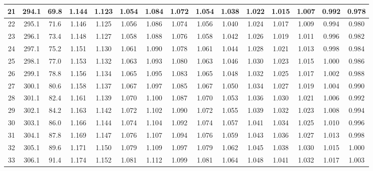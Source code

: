 \documentclass[12pt,a4paper,twoside]{article}
\begin{document}
\begin{center}
\begin{longtable}{ c c c | c c c c c c c c c c c c}
 21 & 294.1 & 69.8 & 1.144 & 1.123 & 1.054 & 1.084 & 1.072 & 1.054 & 1.038 & 1.022 & 1.015 & 1.007 & 0.992 & 0.978 \\ \hline   
 
 22 & 295.1 & 71.6 & 1.146 & 1.125 & 1.056 & 1.086 & 1.074 & 1.056 & 1.040 & 1.024 & 1.017 & 1.009 & 0.994 & 0.980 \\ \hline   
 
 23 & 296.1 & 73.4 & 1.148 & 1.127 & 1.058 & 1.088 & 1.076 & 1.058 & 1.042 & 1.026 & 1.019 & 1.011 & 0.996 & 0.982 \\ \hline   
 
 24 & 297.1 & 75.2 & 1.151 & 1.130 & 1.061 & 1.090 & 1.078 & 1.061 & 1.044 & 1.028 & 1.021 & 1.013 & 0.998 & 0.984 \\ \hline   
 
 25 & 298.1 & 77.0 & 1.153 & 1.132 & 1.063 & 1.093 & 1.080 & 1.063 & 1.046 & 1.030 & 1.023 & 1.015 & 1.000 & 0.986 \\ \hline   
 
 26 & 299.1 & 78.8 & 1.156 & 1.134 & 1.065 & 1.095 & 1.083 & 1.065 & 1.048 & 1.032 & 1.025 & 1.017 & 1.002 & 0.988 \\ \hline   
 
 27 & 300.1 & 80.6 & 1.158 & 1.137 & 1.067 & 1.097 & 1.085 & 1.067 & 1.050 & 1.034 & 1.027 & 1.019 & 1.004 & 0.990 \\ \hline   
 
 28 & 301.1 & 82.4 & 1.161 & 1.139 & 1.070 & 1.100 & 1.087 & 1.070 & 1.053 & 1.036 & 1.030 & 1.021 & 1.006 & 0.992 \\ \hline   
 
 29 & 302.1 & 84.2 & 1.163 & 1.142 & 1.072 & 1.102 & 1.090 & 1.072 & 1.055 & 1.039 & 1.032 & 1.023 & 1.008 & 0.994 \\ \hline   
 
 30 & 303.1 & 86.0 & 1.166 & 1.144 & 1.074 & 1.104 & 1.092 & 1.074 & 1.057 & 1.041 & 1.034 & 1.025 & 1.010 & 0.996 \\ \hline   
 
 31 & 304.1 & 87.8 & 1.169 & 1.147 & 1.076 & 1.107 & 1.094 & 1.076 & 1.059 & 1.043 & 1.036 & 1.027 & 1.013 & 0.998 \\ \hline   
 
 32 & 305.1 & 89.6 & 1.171 & 1.150 & 1.079 & 1.109 & 1.097 & 1.079 & 1.062 & 1.045 & 1.038 & 1.030 & 1.015 & 1.000 \\ \hline   
 
 33 & 306.1 & 91.4 & 1.174 & 1.152 & 1.081 & 1.112 & 1.099 & 1.081 & 1.064 & 1.048 & 1.041 & 1.032 & 1.017 & 1.003 \\ \hline   
 

\end{longtable}
\end{center}
\end{document}
